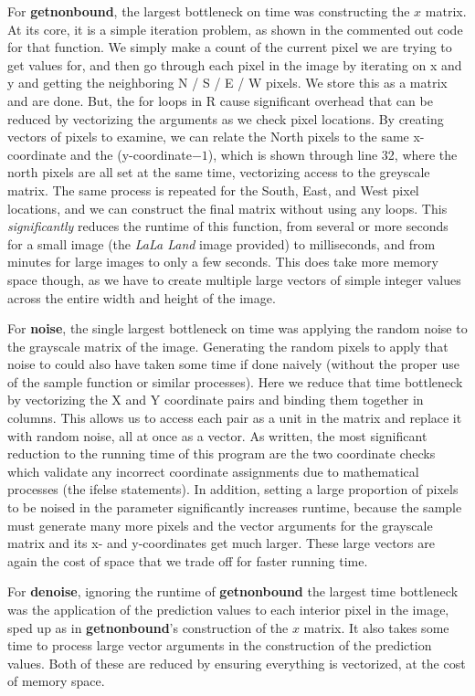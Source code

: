 \documentclass{article}
\begin{document}
For \textbf{getnonbound}, the largest bottleneck on time was constructing the $x$ matrix.  At its core, it is a simple iteration problem, as shown in the commented out code for that function.  We simply make a count of the current pixel we are trying to get values for, and then go through each pixel in the image by iterating on x and y and getting the neighboring N / S / E / W pixels.  We store this as a matrix and are done.  But, the for loops in R cause significant overhead that can be reduced by vectorizing the arguments as we check pixel locations.  By creating vectors of pixels to examine, we can relate the North pixels to the same x-coordinate and the (y-coordinate$-1$), which is shown through line 32, where the north pixels are all set at the same time, vectorizing access to the greyscale matrix.  The same process is repeated for the South, East, and West pixel locations, and we can construct the final matrix without using any loops.  This \textit{significantly} reduces the runtime of this function, from several or more seconds for a small image (the \textit{LaLa Land} image provided) to milliseconds, and from minutes for large images to only a few seconds.  This does take more memory space though, as we have to create multiple large vectors of simple integer values across the entire width and height of the image.

For \textbf{noise}, the single largest bottleneck on time was applying the random noise to the grayscale matrix of the image.  Generating the random pixels to apply that noise to could also have taken some time if done naively (without the proper use of the sample function or similar processes).  Here we reduce that time bottleneck by vectorizing the X and Y coordinate pairs and binding them together in columns.  This allows us to access each pair as a unit in the matrix and replace it with random noise, all at once as a vector.  As written, the most significant reduction to the running time of this program are the two coordinate checks which validate any incorrect coordinate assignments due to mathematical processes (the ifelse statements).  In addition, setting a large proportion of pixels to be noised in the parameter significantly increases runtime, because the sample must generate many more pixels and the vector arguments for the grayscale matrix and its x- and y-coordinates get much larger.  These large vectors are again the cost of space that we trade off for faster running time.

For \textbf{denoise}, ignoring the runtime of \textbf{getnonbound} the largest time bottleneck was the application of the prediction values to each interior pixel in the image, sped up as in \textbf{getnonbound}'s construction of the $x$ matrix.  It also takes some time to process large vector arguments in the construction of the prediction values.  Both of these are reduced by ensuring everything is vectorized, at the cost of memory space.
\end{document}

